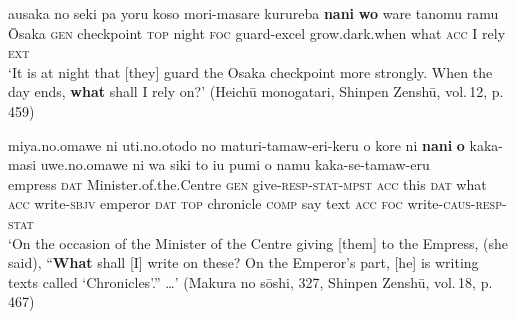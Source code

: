\documentclass[output=paper]{LSP/langsci}
\begin{document}

\begin{exe}
\ex%
\label{07-fr-ex:52}
\gll ausaka no seki pa yoru koso mori-masare kurureba \textbf{nani} \textbf{wo} ware tanomu ramu\\
\=Osaka \textsc{gen} checkpoint \textsc{top} night \textsc{foc} guard-excel grow.dark.when  what \textsc{acc} I rely \textsc{ext}\\
\glt ‘It is at night that [they] guard the Osaka checkpoint more strongly. When the day ends, \textbf{what} shall I rely on?’  (Heichū monogatari, Shinpen Zenshū, vol.\,12, p.\,459)
\end{exe}

\begin{exe}
\ex%
\label{07-fr-ex:53}
\gll miya.no.omawe ni uti.no.otodo no maturi-tamaw-eri-keru o kore ni \textbf{nani} \textbf{o} kaka-masi uwe.no.omawe ni wa siki to iu pumi o namu kaka-se-tamaw-eru\\
empress \textsc{dat} Minister.of.the.Centre \textsc{gen} give-\textsc{resp}-\textsc{stat}-\textsc{mpst} \textsc{acc} this \textsc{dat}  what \textsc{acc} write-\textsc{sbjv} emperor \textsc{dat} \textsc{top} chronicle \textsc{comp} say text \textsc{acc} \textsc{foc} write-\textsc{caus}-\textsc{resp}-\textsc{stat}\\
\glt ‘On the occasion of the Minister of the Centre giving [them] to the Empress, (she said), “\textbf{What} shall [I] write on these? On the Emperor's part, [he] is writing texts called ‘Chronicles’.” …’  (Makura no sōshi, 327, Shinpen Zenshū, vol.\,18, p.\,467)
\end{exe}
\end{document}

